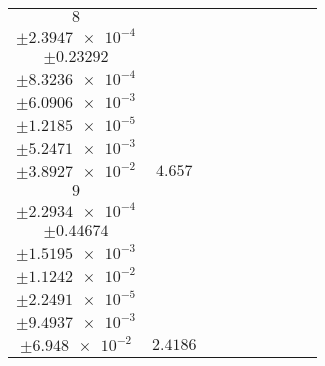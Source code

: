 \documentclass[8pt]{article}
\begin{document}
\begin{longtable}[l]{c c c c c c c c c}
$\num{8}$ & \begin{tabular}[c]{@{}c@{}}$\num{5.7923e-2}$ \\ $\pm\num{2.3947e-4}$\end{tabular} & \begin{tabular}[c]{@{}c@{}}$\num{-0.69313}$ \\ $\pm\num{0.23292}$\end{tabular} & \begin{tabular}[c]{@{}c@{}}$\num{10.385}$ \\ $\pm\num{8.3236e-4}$\end{tabular} & \begin{tabular}[c]{@{}c@{}}$\num{2.0849e+3}$ \\ $\pm\num{6.0906e-3}$\end{tabular} & \begin{tabular}[c]{@{}c@{}}$\num{4.171}$ \\ $\pm\num{1.2185e-5}$\end{tabular} & \begin{tabular}[c]{@{}c@{}}$\num{1.1932}$ \\ $\pm\num{5.2471e-3}$\end{tabular} & \begin{tabular}[c]{@{}c@{}}$\num{4.4961}$ \\ $\pm\num{3.8927e-2}$\end{tabular} & $\num{4.657}$\\
$\num{9}$ & \begin{tabular}[c]{@{}c@{}}$\num{3.0019e-2}$ \\ $\pm\num{2.2934e-4}$\end{tabular} & \begin{tabular}[c]{@{}c@{}}$\num{-0.2571}$ \\ $\pm\num{0.44674}$\end{tabular} & \begin{tabular}[c]{@{}c@{}}$\num{-7.554}$ \\ $\pm\num{1.5195e-3}$\end{tabular} & \begin{tabular}[c]{@{}c@{}}$\num{2.1359e+3}$ \\ $\pm\num{1.1242e-2}$\end{tabular} & \begin{tabular}[c]{@{}c@{}}$\num{4.2729}$ \\ $\pm\num{2.2491e-5}$\end{tabular} & \begin{tabular}[c]{@{}c@{}}$\num{1.1682}$ \\ $\pm\num{9.4937e-3}$\end{tabular} & \begin{tabular}[c]{@{}c@{}}$\num{3.9644}$ \\ $\pm\num{6.948e-2}$\end{tabular} & $\num{2.4186}$\\

\end{longtable}
\end{document}
